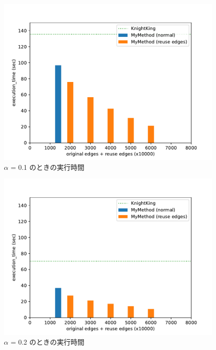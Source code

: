 \begin{figure}[t]
    \centering
    \includegraphics[scale=0.8]{figure/AR_cache_alpha_0.1.pdf}
    \caption{$\alpha$ = 0.1 のときの実行時間}
    \label{alpha = 0.1 のときの実行時間}
\end{figure}

\begin{figure}[t!]
    \centering
    \includegraphics[scale=0.8]{figure/AR_cache_alpha_0.2.pdf}
    \caption{$\alpha$ = 0.2 のときの実行時間}
    \label{alpha = 0.2 のときの実行時間}
\end{figure}

